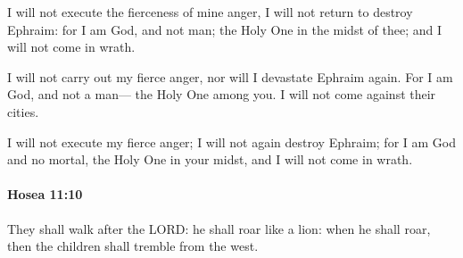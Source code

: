 			\begin{versebox}
					\item[BHS] 
					\item[LXX] 
					\item[ASV] I will not execute the fierceness of mine anger, I will not return to destroy Ephraim: for I am God, and not man; the Holy One in the midst of thee; and I will not come in wrath.
					\item[NIV] I will not carry out my fierce anger, nor will I devastate Ephraim again. For I am God, and not a man— the Holy One among you. I will not come against their cities.
					\item[NRSV] I will not execute my fierce anger; I will not again destroy Ephraim; for I am God and no mortal, the Holy One in your midst, and I will not come in wrath.
			\end{versebox}

		\paragraph{Hosea 11:10} %
			\label{HOSEA-11-10}

			They shall walk after the LORD: he shall roar like a lion: when he shall roar, then the children shall tremble from the west.

